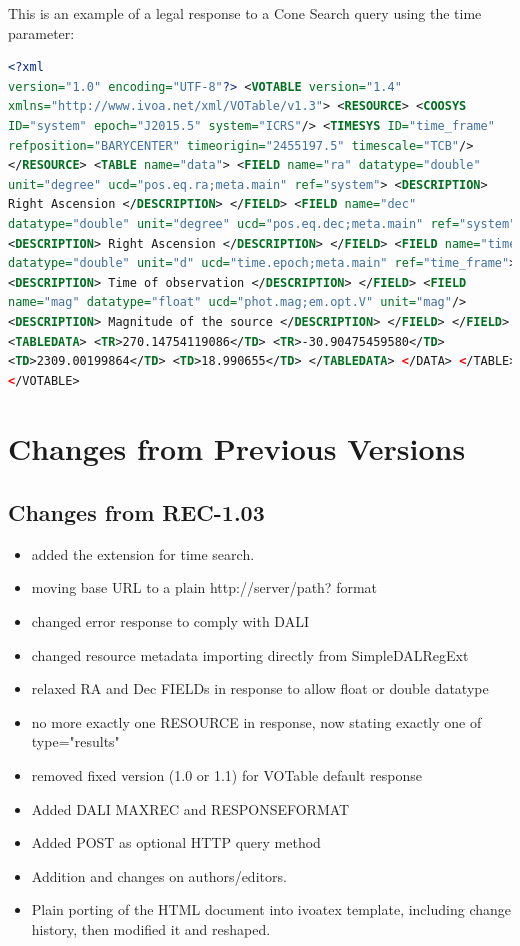\documentclass[11pt,a4paper]{ivoa} 
\begin{document}

This is an example of a legal response to a Cone Search query using the
time parameter: 
\begin{lstlisting}[language=XML,basicstyle=\footnotesize] <?xml
version="1.0" encoding="UTF-8"?> <VOTABLE version="1.4"
xmlns="http://www.ivoa.net/xml/VOTable/v1.3"> <RESOURCE> <COOSYS
ID="system" epoch="J2015.5" system="ICRS"/> <TIMESYS ID="time_frame"
refposition="BARYCENTER" timeorigin="2455197.5" timescale="TCB"/>
</RESOURCE> <TABLE name="data"> <FIELD name="ra" datatype="double"
unit="degree" ucd="pos.eq.ra;meta.main" ref="system"> <DESCRIPTION>
Right Ascension </DESCRIPTION> </FIELD> <FIELD name="dec"
datatype="double" unit="degree" ucd="pos.eq.dec;meta.main" ref="system">
<DESCRIPTION> Right Ascension </DESCRIPTION> </FIELD> <FIELD name="time"
datatype="double" unit="d" ucd="time.epoch;meta.main" ref="time_frame">
<DESCRIPTION> Time of observation </DESCRIPTION> </FIELD> <FIELD
name="mag" datatype="float" ucd="phot.mag;em.opt.V" unit="mag"/>
<DESCRIPTION> Magnitude of the source </DESCRIPTION> </FIELD> </FIELD>
<TABLEDATA> <TR>270.14754119086</TD> <TR>-30.90475459580</TD>
<TD>2309.00199864</TD> <TD>18.990655</TD> </TABLEDATA> </DATA> </TABLE>
</VOTABLE> \end{lstlisting}


\section{Changes from Previous Versions} \label{app:changes}

\subsection{Changes from REC-1.03} \begin{itemize}[noitemsep] \item
added the extension for time search.  \item moving base URL to a plain
http://server/path? format \item changed error response to comply with
DALI \item changed resource metadata importing directly from
SimpleDALRegExt \item relaxed RA and Dec FIELDs in response to allow
float or double datatype \item no more exactly one RESOURCE in response,
now stating exactly one of type="results" \item removed fixed version
(1.0 or 1.1) for VOTable default response \item Added DALI MAXREC and
RESPONSEFORMAT \item Added POST as optional HTTP query method \item
Addition and changes on authors/editors.  \item Plain porting of the
HTML document into ivoatex template, including change history, then
modified it and reshaped.  \end{itemize}
\end{document}
